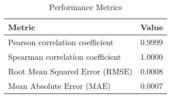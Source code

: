 \documentclass{article}
\begin{document}
    \begin{table}[h!]
    \centering
    \begin{tabular}{ll}
    \toprule
    Metric & Value \\
    \midrule
    Pearson correlation coefficient & 0.9999 \\
    Spearman correlation coefficient & 1.0000 \\
    Root Mean Squared Error (RMSE) & 0.0008 \\
    Mean Absolute Error (MAE) & 0.0007 \\
    \bottomrule
    \end{tabular}
    \caption{Performance Metrics}
    \label{tab:metrics}
    \end{table}

    
\end{document}
